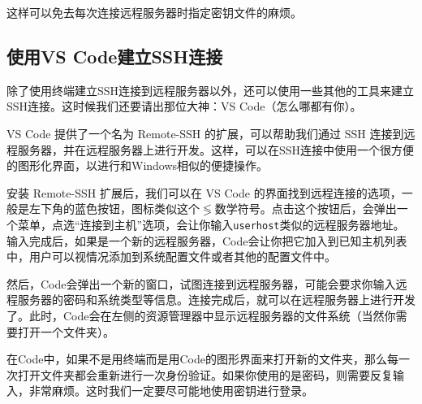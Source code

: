 这样可以免去每次连接远程服务器时指定密钥文件的麻烦。

\subsection{使用VS Code建立SSH连接}

除了使用终端建立SSH连接到远程服务器以外，还可以使用一些其他的工具来建立SSH连接。这时候我们还要请出那位大神：VS Code（怎么哪都有你）。

VS Code 提供了一个名为 Remote-SSH 的扩展，可以帮助我们通过 SSH 连接到远程服务器，并在远程服务器上进行开发。这样，可以在SSH连接中使用一个很方便的图形化界面，以进行和Windows相似的便捷操作。

安装 Remote-SSH 扩展后，我们可以在 VS Code 的界面找到远程连接的选项，一般是左下角的蓝色按钮，图标类似这个$\lessgtr$数学符号。点击这个按钮后，会弹出一个菜单，点选“连接到主机”选项，会让你输入\texttt{user\@ host}类似的远程服务器地址。输入完成后，如果是一个新的远程服务器，Code会让你把它加入到已知主机列表中，用户可以视情况添加到系统配置文件或者其他的配置文件中。

然后，Code会弹出一个新的窗口，试图连接到远程服务器，可能会要求你输入远程服务器的密码和系统类型等信息。连接完成后，就可以在远程服务器上进行开发了。此时，Code会在左侧的资源管理器中显示远程服务器的文件系统（当然你需要打开一个文件夹）。

在Code中，如果不是用终端而是用Code的图形界面来打开新的文件夹，那么每一次打开文件夹都会重新进行一次身份验证。如果你使用的是密码，则需要反复输入，非常麻烦。这时我们一定要尽可能地使用密钥进行登录。